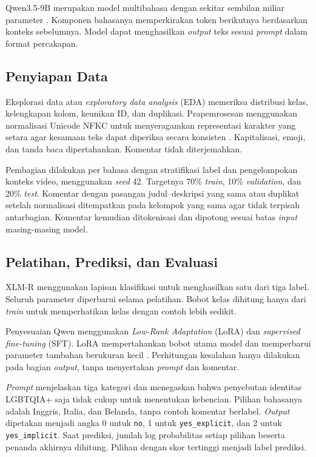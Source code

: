 \documentclass[11pt]{article}
\begin{document}
Qwen3.5-9B merupakan model multibahasa dengan sekitar sembilan miliar parameter \citep{qwen-team-2026-qwen35}. Komponen bahasanya memperkirakan token berikutnya berdasarkan konteks sebelumnya. Model dapat menghasilkan \textit{output} teks sesuai \textit{prompt} dalam format percakapan.

\subsection{Penyiapan Data}
Eksplorasi data atau \textit{exploratory data analysis} (EDA) memeriksa distribusi kelas, kelengkapan kolom, keunikan ID, dan duplikasi. Prapemrosesan menggunakan normalisasi Unicode NFKC untuk menyeragamkan representasi karakter yang setara agar kesamaan teks dapat diperiksa secara konsisten \citep{unicode-consortium-2026-normalization}. Kapitalisasi, emoji, dan tanda baca dipertahankan. Komentar tidak diterjemahkan.

Pembagian dilakukan per bahasa dengan stratifikasi label dan pengelompokan konteks video, menggunakan \textit{seed} 42. Targetnya 70\% \textit{train}, 10\% \textit{validation}, dan 20\% \textit{test}. Komentar dengan pasangan judul--deskripsi yang sama atau duplikat setelah normalisasi ditempatkan pada kelompok yang sama agar tidak terpisah antarbagian. Komentar kemudian ditokenisasi dan dipotong sesuai batas \textit{input} masing-masing model.

\subsection{Pelatihan, Prediksi, dan Evaluasi}
XLM-R menggunakan lapisan klasifikasi untuk menghasilkan satu dari tiga label. Seluruh parameter diperbarui selama pelatihan. Bobot kelas dihitung hanya dari \textit{train} untuk memperhatikan kelas dengan contoh lebih sedikit.

Penyesuaian Qwen menggunakan \textit{Low-Rank Adaptation} (LoRA) dan \textit{supervised fine-tuning} (SFT). LoRA mempertahankan bobot utama model dan memperbarui parameter tambahan berukuran kecil \citep{hu-etal-2021-lora}. Perhitungan kesalahan hanya dilakukan pada bagian \textit{output}, tanpa menyertakan \textit{prompt} dan komentar.

\textit{Prompt} menjelaskan tiga kategori dan menegaskan bahwa penyebutan identitas LGBTQIA+ saja tidak cukup untuk menentukan kebencian. Pilihan bahasanya adalah Inggris, Italia, dan Belanda, tanpa contoh komentar berlabel. \textit{Output} dipetakan menjadi angka 0 untuk \texttt{no}, 1 untuk \texttt{yes\_explicit}, dan 2 untuk \texttt{yes\_implicit}. Saat prediksi, jumlah log probabilitas setiap pilihan beserta penanda akhirnya dihitung. Pilihan dengan skor tertinggi menjadi label prediksi.
\end{document}
